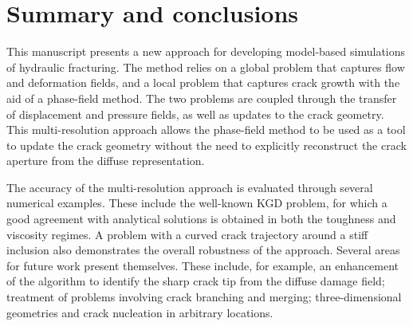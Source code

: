 \section{Summary and conclusions}

This manuscript presents a new approach for developing model-based simulations of hydraulic fracturing. 
The method relies on a global problem that captures flow and deformation fields, and a local problem that captures crack growth with the aid of a phase-field method.  The two problems are coupled through the transfer of displacement and pressure fields, as well as updates to the crack geometry.  This multi-resolution approach allows the phase-field method to be used as a tool to update the crack geometry without the need to explicitly reconstruct the crack aperture from the diffuse representation.  

The accuracy of the multi-resolution approach is evaluated through several numerical examples. These include the well-known KGD problem, for which a good agreement with analytical solutions is obtained in both the toughness and viscosity regimes. A problem with a curved crack trajectory around a stiff inclusion also demonstrates the overall robustness of the approach.  Several areas for future work present themselves. These include, for example, an enhancement of the algorithm to identify the sharp crack tip from the diffuse damage field; treatment of problems involving crack branching and merging; three-dimensional geometries and crack nucleation in arbitrary locations.

